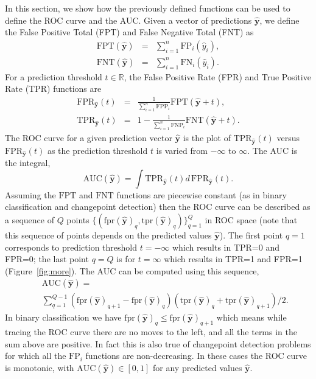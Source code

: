 \documentclass{article}
\begin{document}
In this section, we show how the previously defined functions can be used to define the ROC curve and the AUC.
Given a vector of predictions $\mathbf{\hat y}$, we define the False Positive Total (FPT) and False Negative Total (FNT) as
\begin{eqnarray}
 \text{FPT}(\mathbf {\hat y}) &=&
 \sum_{i=1}^n \text{FP}_i(\hat y_i), \\
 \text{FNT}(\mathbf {\hat y}) &=&
 \sum_{i=1}^n \text{FN}_i(\hat y_i).
\end{eqnarray}
For a prediction threshold $t\in\mathbb R$, the False Positive Rate (FPR) and True Positive Rate (TPR) functions are
\begin{eqnarray}
 \text{FPR}_{\mathbf {\hat y}}(t) &=&
 \frac{1}{\sum_{i=1}^n \text{FPP}_i } 
 \text{FPT}(\mathbf {\hat y}+t), \\
 \text{TPR}_{\mathbf {\hat y}}(t) &=&
 1 - 
 \frac{1}{\sum_{i=1}^n \text{FNP}_i } 
 \text{FNT}(\mathbf {\hat y}+t).
\end{eqnarray}
The ROC curve for a given prediction vector $\mathbf {\hat y}$ is the plot of $\text{TPR}_{\mathbf {\hat y}}(t) $ versus $\text{FPR}_{\mathbf {\hat y}}(t) $ as the prediction threshold $t$ is varied from $-\infty$ to $\infty$.
The AUC is the integral,
\begin{equation}
    \text{AUC}(\mathbf{\hat y}) = 
    \int \text{TPR}_{\mathbf {\hat y}}(t) 
    d\, \text{FPR}_{\mathbf{\hat y}}(t).
\end{equation}
Assuming the $\text{FPT}$ and $\text{FNT}$ functions are piecewise constant (as in binary classification and changepoint detection) then the ROC curve can be described as a sequence of $Q$ points 
$\{(\text{fpr}
(\mathbf {\hat y})
_q, \text{tpr}
(\mathbf {\hat y})
_q)\}_{q=1}^Q$ in ROC space (note that this sequence of points depends on the predicted values $\mathbf {\hat y}$).
The first point $q=1$ corresponds to prediction threshold $t=-\infty$ which results in TPR=0 and FPR=0; the last point $q=Q$ is for $t=\infty$ which results in TPR=1 and FPR=1 (Figure~\ref{fig:more}).
The AUC can be computed using this sequence,
\begin{eqnarray}
\label{eq:auc-seq}
&&\text{AUC}(\mathbf {\hat y}) = \\
  &&  \sum_{q=1}^{Q-1} 
    (\text{fpr}
    (\mathbf {\hat y})
    _{q+1} - \text{fpr}
    (\mathbf {\hat y})
    _q)
    (\text{tpr}
    (\mathbf {\hat y})
    _{q} + \text{tpr}
    (\mathbf {\hat y})
    _{q+1})/2.\nonumber
\end{eqnarray}
In binary classification we have $\text{fpr}(\mathbf {\hat y})_{q} \leq \text{fpr}(\mathbf {\hat y})_{q+1}$ which means while tracing the ROC curve there are no moves to the left, and all the terms in the sum above are positive.
In fact this is also true of changepoint detection problems for which all the $\text{FP}_i$ functions are non-decreasing. 
In these cases the ROC curve is monotonic, with $\text{AUC}(\mathbf {\hat y})\in[0,1]$ for any predicted values $\mathbf {\hat y}$.
\end{document}
